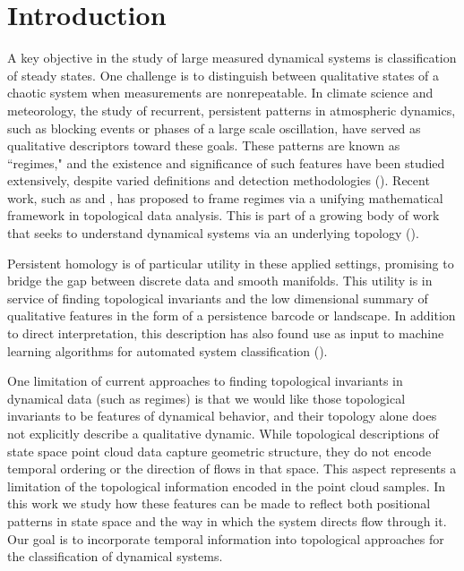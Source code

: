 \documentclass[pdflatex,bst/sn-mathphys-num]{sn-jnl}%
\theoremstyle{thmstyleone}%
\theoremstyle{definition}
\theoremstyle{thmstyletwo}%
\theoremstyle{thmstylethree}%
\begin{document}

\maketitle

\section{Introduction}\label{sec1}



A key objective in the study of large measured dynamical systems is classification of steady states. One challenge is to distinguish between qualitative states of a chaotic system when measurements are nonrepeatable. In climate science and meteorology, the study of recurrent, persistent patterns in atmospheric dynamics, such as blocking events or phases of a large scale oscillation, have served as qualitative descriptors toward these goals. These patterns are known as ``regimes," and the existence and significance of such features have been studied extensively, despite varied definitions and detection methodologies (\cite{Hannachi2017,Gilmore_1998,Palmer99}). Recent work, such as \cite{Strommen_2022} and \cite{Kappe_Bottinger_Leitte_2022}, has proposed to frame regimes via a unifying mathematical framework in topological data analysis. This is part of a growing body of work that seeks to understand dynamical systems via an underlying topology (\cite{Yalniz20, Maletic_Zhao_Rajkovic_2016,Tanweer_Khasawneh_Munch_Tempelman_2024}).

Persistent homology is of particular utility in these applied settings, promising to bridge the gap between discrete data and smooth manifolds. This utility is in service of finding topological invariants and the low dimensional summary of qualitative features in the form of a persistence barcode or landscape. In addition to direct interpretation, this description has also found use as input to  machine learning algorithms for automated system classification (\cite{Pun_Lee_Xia_2022, Hussain_Shah_Rafia_Fatima_Huerta-Cuellar_Garcia-Lopez_Mata_amirez_Jaimes-Reategui_2025}).

One limitation of current approaches to finding topological invariants in dynamical data (such as regimes) is that we would like those topological invariants to be features of dynamical behavior, and their topology alone does not explicitly describe a qualitative dynamic. While topological descriptions of state space point cloud data capture geometric structure, they do not encode temporal ordering or the direction of flows in that space. This aspect represents a limitation of the topological information encoded in the point cloud samples. In this work we study how these features can be made to reflect both positional patterns in state space and the way in which the system directs flow through it. Our goal is to incorporate temporal information into topological approaches for the classification of dynamical systems.
\end{document}

